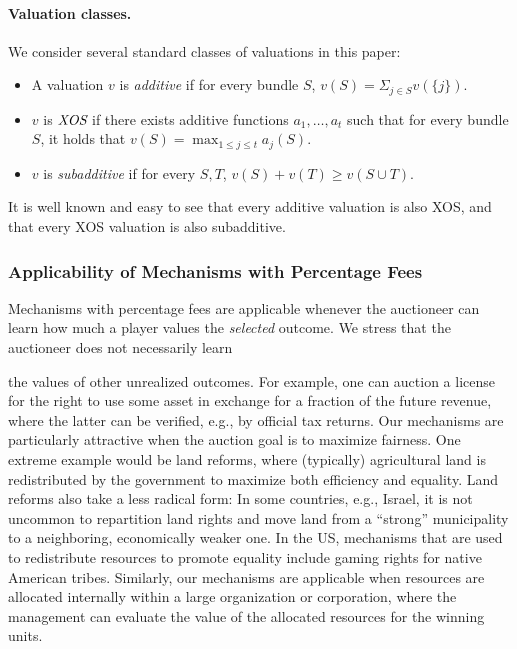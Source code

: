 \documentclass{theoretics}
\begin{document}
\paragraph{Valuation classes.} We consider several standard classes of valuations in this paper: 
\begin{itemize}
\item A valuation $v$ is \emph{additive} if for every bundle $S$, $v(S)=\Sigma_{j\in S}v(\{j\})$.
\item $v$ is $\emph{XOS}$ if there exists additive functions $a_1,\ldots, a_t$ such that for every bundle $S$, it holds that $v(S)=\max_{1\leq j\leq t}a_j(S)$.
\item $v$ is \emph{subadditive} if for every $S,T$, $v(S)+v(T) \geq v(S\cup T)$. 
\end{itemize}

It is well known and easy to see that every additive valuation is also XOS, and that every XOS valuation is also subadditive.

\subsubsection*{Applicability of Mechanisms with Percentage Fees}

Mechanisms with percentage fees are applicable whenever the auctioneer can learn how much a player values the \emph{selected} outcome. We stress that 
the auctioneer does not necessarily learn

the values of other unrealized outcomes. For example, one can auction a license for the right to use some asset in exchange for a fraction of the future revenue, where the latter can be verified, e.g., by official tax returns. Our mechanisms are particularly attractive when the auction goal is to maximize fairness. One extreme example would be land reforms, where (typically) agricultural land is redistributed by the government to maximize both efficiency and equality. Land reforms also take a less radical form: In some countries, e.g., Israel, it is not uncommon to repartition land rights and move land from a ``strong'' municipality to a neighboring, economically weaker one. In the US, mechanisms that are used to redistribute resources to promote equality include gaming rights for native American tribes. Similarly, our mechanisms are applicable when resources are allocated internally within a large organization or corporation, where the management can evaluate the value of the allocated resources for the winning units.
\end{document}
